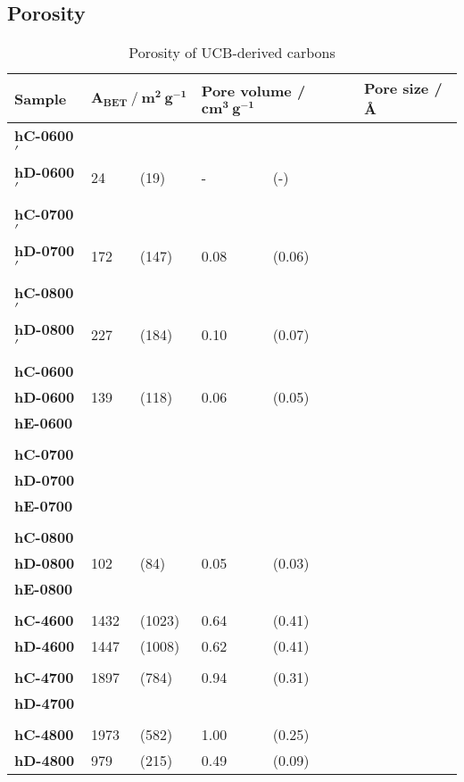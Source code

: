 \subsection{Porosity}

\begin{table}[]
    \caption{Porosity of UCB-derived carbons}
    \label{tb:cb_porosity}
    \begin{tabularx}{\textwidth}{lllllll}
    \toprule
        \textbf{Sample} & \multicolumn{2}{l}{$\mathbf{A_{BET}\ /\ m^2\ g^{-1}}$}  & \multicolumn{2}{l}{\textbf{Pore volume} / $\mathbf{cm^3\ g^{-1}}$} & \multicolumn{2}{l}{\textbf{Pore size / \AA}} \\
    \midrule
        \textbf{hC-0600$'$} & & & \\
        \textbf{hD-0600$'$} & 24 & (19) & - & (-) & \\
        & & & \\
        \textbf{hC-0700$'$} & & & \\
        \textbf{hD-0700$'$} & 172 & (147) & 0.08 & (0.06) \\
        & & & \\
        \textbf{hC-0800$'$} & & & \\
        \textbf{hD-0800$'$} & 227 & (184) & 0.10 & (0.07) \\
        & & & \\
        \textbf{hC-0600} & & & \\
        \textbf{hD-0600} & 139 & (118) & 0.06 & (0.05) & \\
        \textbf{hE-0600} & & & \\
        & & & \\
        \textbf{hC-0700} & & & \\
        \textbf{hD-0700} & & & \\
        \textbf{hE-0700} & & & \\
        & & & \\
        \textbf{hC-0800} & & & \\
        \textbf{hD-0800} & 102 & (84) & 0.05 & (0.03) \\
        \textbf{hE-0800} & & & \\
        & & & \\
        \textbf{hC-4600} & 1432 & (1023) & 0.64 & (0.41) &  \\
        \textbf{hD-4600} & 1447 & (1008) & 0.62 & (0.41) & \\
        & & & \\
        \textbf{hC-4700} & 1897 & (784) & 0.94 & (0.31) & \\
        \textbf{hD-4700} & & & \\
        & & & \\
        \textbf{hC-4800} & 1973 & (582) & 1.00 & (0.25) & \\
        \textbf{hD-4800} & 979 & (215) & 0.49 & (0.09) &  \\
    \bottomrule
    \end{tabularx}
\end{table}

